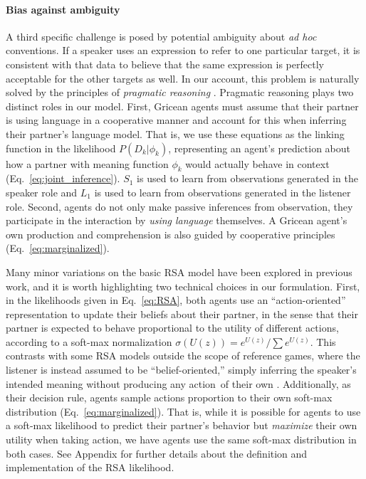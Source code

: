 \paragraph{Bias against ambiguity}

A third specific challenge is posed by potential ambiguity about \emph{ad hoc} conventions.
If a speaker uses an expression to refer to one particular target, it is consistent with that data to believe that the same expression is perfectly acceptable for the other targets as well. 
In our account, this problem is naturally solved by the principles of \textit{pragmatic reasoning} \cite{Grice75_LogicConversation}.
Pragmatic reasoning plays two distinct roles in our model.
First, Gricean agents must assume that their partner is using language in a cooperative manner and account for this when inferring their partner's language model.
That is, we use these equations as the linking function in the likelihood $P(D_k | \phi_k)$, representing an agent's prediction about how a partner with meaning function $\phi_k$ would actually behave in context (Eq.~\ref{eq:joint_inference}). 
$S_1$ is used to learn from observations generated in the speaker role and $L_1$ is used to learn from observations generated in the listener role.
Second, agents do not only make passive inferences from observation, they participate in the interaction by \emph{using language} themselves.
A Gricean agent's own production and comprehension is also guided by cooperative principles (Eq.~\ref{eq:marginalized}).

Many minor variations on the basic RSA model have been explored in previous work, and it is worth highlighting two technical choices in our formulation.
First, in the likelihoods given in Eq.~\ref{eq:RSA}, both agents use an ``action-oriented'' representation to update their beliefs about their partner, in the sense that their partner is expected to behave proportional to the utility of different actions, according to a soft-max normalization $\sigma(U(z)) = e^{U(z)}/\sum e^{U(z)}$.
This contrasts with some RSA models outside the scope of reference games, where the listener is instead assumed to be ``belief-oriented,'' simply inferring the speaker's intended meaning without producing any action of their own \cite{qing2015variations}.
Additionally, as their decision rule, agents sample actions proportion to their own soft-max distribution (Eq.~\ref{eq:marginalized}).
That is, while it is possible for agents to use a soft-max likelihood to predict their partner's behavior but \emph{maximize} their own utility when taking action, we have agents use the same soft-max distribution in both cases.
See Appendix for further details about the definition and implementation of the RSA likelihood.


